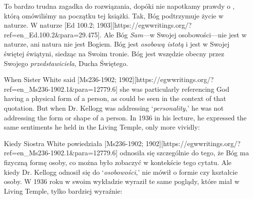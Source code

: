 To bardzo trudna zagadka do rozwiązania, dopóki nie napotkamy prawdy o , którą omówiliśmy na początku tej książki. Tak, Bóg podtrzymuje życie w naturze. W naturze [Ed 100.2; 1903][https://egwwritings.org/?ref=en\_Ed.100.2&para=29.475]. Ale Bóg \textit{Sam}—w Swojej osobowości—nie jest w naturze, ani natura nie jest Bogiem. Bóg jest \textit{osobową istotą} i jest w Swojej świętej świątyni, siedząc na Swoim tronie. Bóg jest wszędzie obecny przez Swojego \textit{przedstawiciela}, Ducha Świętego.


When Sister White said [Ms236-1902; 1902][https://egwwritings.org/?ref=en\_Ms236-1902.1&para=12779.6] she was particularly referencing God having a physical form of a person, as could be seen in the context of that quotation. But when Dr. Kellogg was addressing ‘\textit{personality},’ he was not addressing the form or shape of a person. In 1936 in his lecture, he expressed the same sentiments he held in the Living Temple, only more vividly:


Kiedy Siostra White powiedziała [Ms236-1902; 1902][https://egwwritings.org/?ref=en\_Ms236-1902.1&para=12779.6] odnosiła się szczególnie do tego, że Bóg ma fizyczną formę osoby, co można było zobaczyć w kontekście tego cytatu. Ale kiedy Dr. Kellogg odnosił się do ‘\textit{osobowości},’ nie mówił o formie czy kształcie osoby. W 1936 roku w swoim wykładzie wyraził te same poglądy, które miał w Living Temple, tylko bardziej wyraźnie:






